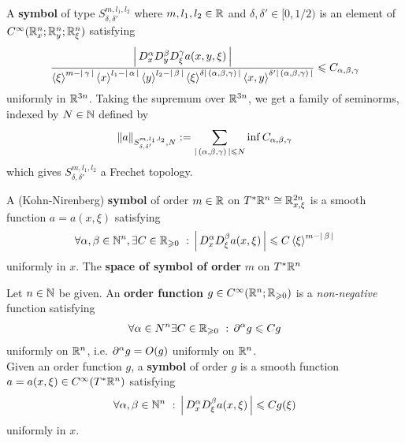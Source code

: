 \documentclass{article}
\begin{document}
\begin{fdefinition}
A \textbf{symbol} of type $S^{m, l_1, l_2}_{\delta, \delta'}$ where $m, l_1, l_2 \in \R$ and $\delta, \delta' \in [0, 1/2)$ is an element of $C^\infty(\R^n_x; \R^n_y; \R^n_\xi)$ satisfying 
\begin{align*}
\frac{\abs{D^\alpha_xD^\beta_yD^\gamma_\xi a(x, y, \xi)}}{\sym[\xi]^{m - \abs{\gamma}} \sym[x]^{l_1 - \abs{\alpha}} \sym[y]^{l_2 - \abs{\beta}} \sym[\xi]^{\delta \abs{(\alpha, \beta, \gamma)}} \sym[x, y]^{\delta' \abs{(\alpha, \beta, \gamma)}}} \leq C_{\alpha, \beta, \gamma}
\end{align*}
uniformly in $\R^{3n}$. Taking the supremum over $\R^{3n}$, we get a family of seminorms, indexed by $N \in \N$ defined by 
\begin{align*}
\norm[a]_{S^{m, l_1, l_2}_{\delta, \delta'}, N} := \sum_{\abs{(\alpha, \beta, \gamma)} \leq N} \inf C_{\alpha, \beta, \gamma}
\end{align*}
which gives $S^{m, l_1, l_2}_{\delta, \delta'}$ a Frechet topology. 
\end{fdefinition}

\begin{fdefinition}
    A (Kohn-Nirenberg) \textbf{symbol} of order $m \in \R$ on $T^*\R^n \cong \R^{2n}_{x, \xi}$ is a smooth function $a = a(x, \xi)$ satisfying
    \begin{align*}
    \forall \alpha, \beta \in \N^n, \exists C \in \R_{\geq 0} \st \abs{D_x^\alpha D_\xi^\beta a(x, \xi)} \leq C\inprod[\xi]^{m - \abs{\beta}}
    \end{align*}
    uniformly in $x$. The \textbf{space of symbol of order} $m$ on $T^*\R^n$
\end{fdefinition}

\begin{fdefinition}
Let $n \in \N$ be given. An \textbf{order function} $g \in C^\infty(\R^n; \R_{\geq 0})$ is a \textit{non-negative} function satisfying 
\begin{align*}
\forall \alpha \in N^n \exists C \in \R_{\geq 0} \st \p^\alpha g \leq C g
\end{align*}
uniformly on $\R^n$, i.e. $\p^\alpha g = O(g)$ uniformly on $\R^n$. \\

Given an order function $g$, a \textbf{symbol} of order $g$ is a smooth function $a = a(x, \xi) \in C^\infty(T^*\R^n)$ satisfying 
\begin{align*}
\forall \alpha, \beta \in \N^n \st \abs{D^\alpha_x D^\beta_\xi a(x, \xi)} \leq C g(\xi)
\end{align*}
uniformly in $x$.
\end{fdefinition}
\end{document}

